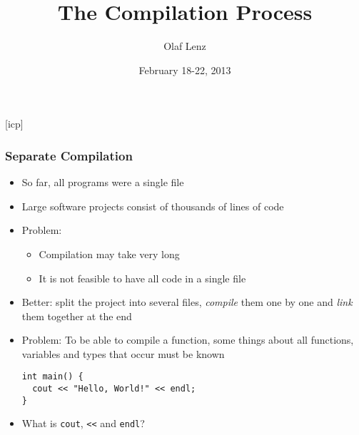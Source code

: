 \documentclass{slides}
\begin{document}
\graphicspath{{figures/}}

\title[The Compilation Process]{\Large The Compilation Process}

\author[O. Lenz]{Olaf Lenz} 
\date{February 18-22, 2013}

\begin{frame}
  \titlepage
\end {frame}
[icp]

\begin{frame}[fragile]
  \frametitle{Separate Compilation}
  \begin{itemize}
  \item So far, all programs were a single file
  \item Large software projects consist of thousands of lines of
    code
  \item Problem:
    \begin{itemize}
    \item Compilation may take very long
    \item It is not feasible to have all code in a single file
    \end{itemize}
  \item Better: split the project into several files, \emph{compile}
    them one by one and \emph{link} them together at the end
  \item Problem: To be able to compile a function, some things about
    all functions, variables and types that occur must be known
    \begin{lstlisting}
int main() {
  cout << "Hello, World!" << endl;
}    
\end{lstlisting}
    \item What is \lstinline!cout!, \lstinline!<<! and \lstinline!endl!?
  \end{itemize}
  
\end{frame}
\end{document}
